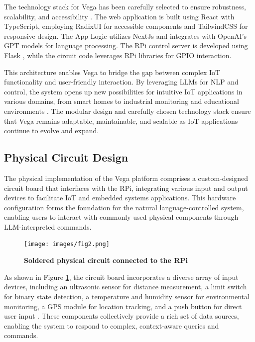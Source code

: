 \documentclass[lettersize,journal]{IEEEtran}
\begin{document}
The technology stack for Vega has been carefully selected to ensure robustness, scalability, and accessibility \cite{math9040308}. The web application is built using React \cite{React2024} with TypeScript, employing RadixUI \cite{radix-ui} for accessible components and TailwindCSS \cite{tailwindcss} for responsive design. The App Logic utilizes NextJs \cite{NextJS} and integrates with OpenAI's GPT models \cite{OpenAI_GPT} for language processing. The RPi control server is developed using Flask \cite{Flask2024}, while the circuit code leverages RPi libraries for GPIO interaction.

This architecture enables Vega to bridge the gap between complex IoT functionality and user-friendly interaction. By leveraging LLMs for NLP and control, the system opens up new possibilities for intuitive IoT applications in various domains, from smart homes to industrial monitoring and educational environments \cite{8067944}. The modular design and carefully chosen technology stack ensure that Vega remains adaptable, maintainable, and scalable as IoT applications continue to evolve and expand.

\subsection{Physical Circuit Design}
The physical implementation of the Vega platform comprises a custom-designed circuit board that interfaces with the RPi, integrating various input and output devices to facilitate IoT and embedded systems applications. This hardware configuration forms the foundation for the natural language-controlled system, enabling users to interact with commonly used physical components  through LLM-interpreted commands.


\begin{figure}[!h]
  \centering
  \texttt{[image: images/fig2.png]}
  \caption{\centering \textbf{Soldered physical circuit connected to the RPi}}
  \label{fig2}
  \end{figure}

As shown in Figure \ref{fig2}, the circuit board incorporates a diverse array of input devices, including an ultrasonic sensor for distance measurement, a limit switch for binary state detection, a temperature and humidity sensor for environmental monitoring, a GPS module for location tracking, and a push button for direct user input \cite{electronicwings_sensors_modules}. These components collectively provide a rich set of data sources, enabling the system to respond to complex, context-aware queries and commands.
\end{document}
